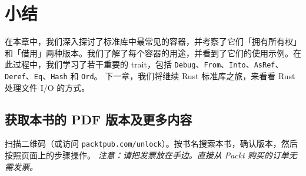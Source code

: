 \section{小结}
在本章中，我们深入探讨了标准库中最常见的容器，并考察了它们「拥有所有权」和「借用」两种版本。我们了解了每个容器的用途，并看到了它们的使用示例。在此过程中，我们学习了若干重要的 trait，包括
\texttt{Debug}、\texttt{From}、\texttt{Into}、\texttt{AsRef}、\texttt{Deref}、\texttt{Eq}、\texttt{Hash} 和 \texttt{Ord}。
下一章，我们将继续 Rust 标准库之旅，来看看 Rust 处理文件 I/\allowbreak{}O 的方式。
\begin{samepage}
\subsection{获取本书的 PDF 版本及更多内容}
扫描二维码（或访问 \texttt{packtpub.\allowbreak{}com/\allowbreak{}unlock}）。按书名搜索本书，确认版本，然后按照页面上的步骤操作。
\emph{注意：请把发票放在手边。直接从 Packt 购买的订单无需发票。}
\end{samepage}
